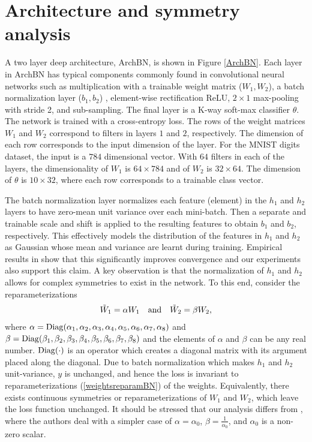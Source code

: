 \documentclass{article} %
\newcommand{\changeBM}[1]{#1} %
\newcommand{\changeVB}[1]{#1} %
\newcommand{\Diag}{{\rm Diag}}
\begin{document}


\section{Architecture and symmetry analysis}
\label{Architecture}
A two layer deep architecture, ArchBN, is shown in Figure \ref{ArchBN}. Each layer in ArchBN has typical components commonly found in convolutional neural networks \cite{LeCunNature} such as multiplication with a trainable weight matrix ($W_{1},W_{2}$), a batch normalization layer ($b_{1},b_{2}$) \cite{BN}, element-wise rectification ReLU, $2\times1$ max-pooling with stride 2, and sub-sampling. The final layer is a K-way soft-max classifier $\theta$. The network is trained with a cross-entropy loss. \changeVB{The rows of the weight matrices $W_{1}$ and $W_{2}$ correspond to filters in layers $1$ and $2$, respectively. The dimension of each row corresponds to the input dimension of the layer. For the MNIST digits dataset, the input is a $784$ dimensional vector. With $64$ filters in each of the layers, the dimensionality of $W_{1}$ is $64\times784$ and of $W_{2}$ is $32\times64$. The dimension of $\theta$ is $10\times32$, where each row corresponds to a trainable class vector.} 

\changeVB{The batch normalization \cite{BN} layer normalizes each feature (element) in the $h_{1}$ and $h_{2}$ layers to have zero-mean unit variance over each mini-batch. Then a separate and trainable scale and shift is applied to the resulting features to obtain $b_{1}$ and $b_{2}$, respectively. This effectively models the distribution of the features in $h_{1}$ and $h_{2}$ as Gaussian whose mean and variance are learnt during training. Empirical results in  \cite{BN} show that this significantly improves convergence and our experiments also support this claim.} \changeBM{A key observation is that the} normalization of $h_{1}$ and $h_{2}$ allows for complex symmetries to exist in the network. \changeBM{To this end,} consider the reparameterizations
\begin{align}
\label{weightsreparamBN}
\tilde{W}_{1} =  \alpha W_{1} \quad {\rm and} \quad \tilde{W}_{2} =  \beta W_{2}, 
\end{align}
where $\mathbf{\alpha} = \Diag(\alpha_{1},\alpha_{2},\alpha_{3},\alpha_{4},\alpha_{5},\alpha_{6},\alpha_{7},\alpha_{8}) $ and $ \mathbf{\beta} = \Diag(\beta_{1},\beta_{2},\beta_{3},\beta_{4},\beta_{5},\beta_{6},\beta_{7},\beta_{8})$ and the elements of $\alpha$ and $\beta$ can be any real number. $\Diag(\cdot)$ is an operator which creates a diagonal matrix with its argument placed along the diagonal. Due to batch normalization which makes $h_1$ and $h_2$ unit-variance, $y$ is unchanged, and hence the loss is invariant to reparameterizations (\ref{weightsreparamBN}) of the weights. \changeBM{Equivalently}, there exists continuous symmetries or reparameterizations of $W_1$ and $W_2$, which leave the loss function unchanged. \changeBM{It should be stressed that our analysis differs from \cite{PathSGD}, where the authors deal with a simpler case of $\alpha = \alpha_{0}$, $\beta = \frac{1}{\alpha_{0}}$, and $\alpha_0$ is a non-zero scalar}. 
\end{document}
